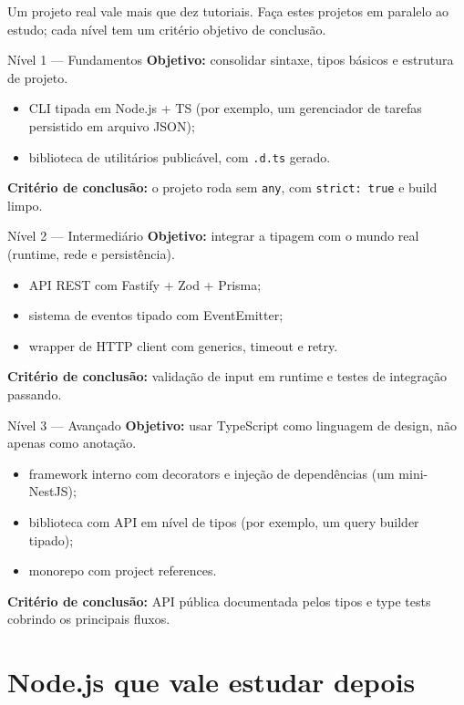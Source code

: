 \documentclass[12pt,a4paper,oneside]{book}
\newcommand{\code}[1]{\texttt{#1}}
\begin{document}
Um projeto real vale mais que dez tutoriais. Faça estes projetos em paralelo ao estudo; cada nível tem um critério objetivo de conclusão.

\begin{projeto}{Nível 1 --- Fundamentos}
\textbf{Objetivo:} consolidar sintaxe, tipos básicos e estrutura de projeto.
\begin{itemize}
  \item CLI tipada em Node.js + TS (por exemplo, um gerenciador de tarefas persistido em arquivo JSON);
  \item biblioteca de utilitários publicável, com \code{.d.ts} gerado.
\end{itemize}
\textbf{Critério de conclusão:} o projeto roda sem \code{any}, com \code{strict: true} e build limpo.
\end{projeto}

\begin{projeto}{Nível 2 --- Intermediário}
\textbf{Objetivo:} integrar a tipagem com o mundo real (runtime, rede e persistência).
\begin{itemize}
  \item API REST com Fastify + Zod + Prisma;
  \item sistema de eventos tipado com EventEmitter;
  \item wrapper de HTTP client com generics, timeout e retry.
\end{itemize}
\textbf{Critério de conclusão:} validação de input em runtime e testes de integração passando.
\end{projeto}

\begin{projeto}{Nível 3 --- Avançado}
\textbf{Objetivo:} usar TypeScript como linguagem de design, não apenas como anotação.
\begin{itemize}
  \item framework interno com decorators e injeção de dependências (um mini-NestJS);
  \item biblioteca com API em nível de tipos (por exemplo, um query builder tipado);
  \item monorepo com project references.
\end{itemize}
\textbf{Critério de conclusão:} API pública documentada pelos tipos e type tests cobrindo os principais fluxos.
\end{projeto}

\chapter{Node.js que vale estudar depois}
\label{cap:node}
\end{document}

